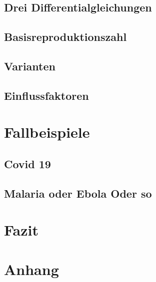 \documentclass[12pt]{scrartcl} %
\begin{document}
\subsection{Drei Differentialgleichungen}


\subsection{Basisreproduktionszahl}


\subsection{Varianten}


\subsection{Einflussfaktoren}


\section{Fallbeispiele}

\subsection{Covid 19}


\subsection{Malaria oder Ebola Oder so}


\section{Fazit}


\newpage
\section{Anhang}


\newpage
\setlength{\bibitemsep}{\baselineskip}
\printbibliography[heading=bibintoc]
\end{document}
